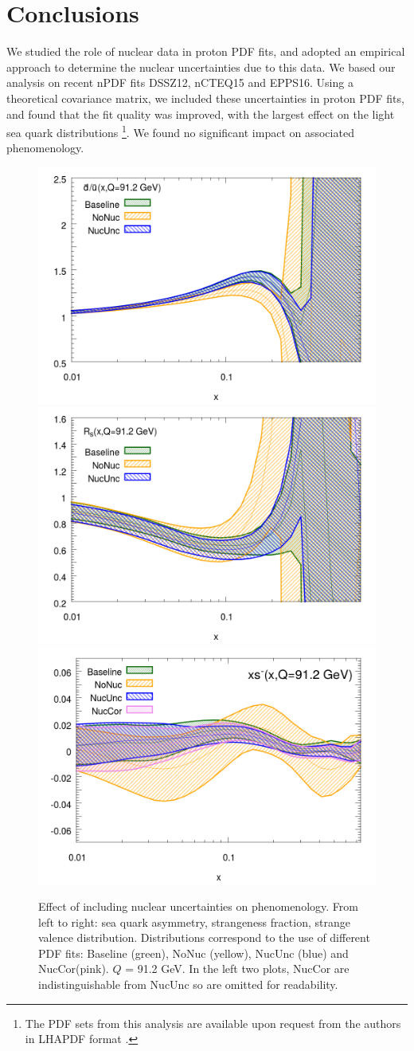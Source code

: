 \section{Conclusions} \label{sec:conc}
%
We studied the role of nuclear data in proton PDF fits, and adopted an empirical approach to determine the nuclear uncertainties due to this data. We based our analysis on recent nPDF fits DSSZ12, nCTEQ15 and EPPS16. Using a theoretical covariance matrix, we included these uncertainties in proton PDF fits, and found that the fit quality was improved, with the largest effect on the light sea quark distributions \footnote{The PDF sets from this analysis are available upon request from the authors in LHAPDF format \cite{Buckley:2014ana}.}. We found no significant impact on associated phenomenology. 
\begin{figure}[h]
  \centering
\includegraphics[width=0.6\linewidth]{nuclear/du_max.png}
\includegraphics[width=0.6\linewidth]{nuclear/Rs_max.png}
\includegraphics[width=0.6\linewidth]{nuclear/sval_max.png}
    \caption{Effect of including nuclear uncertainties on phenomenology. From left to right: sea quark asymmetry, strangeness fraction, strange valence distribution. Distributions correspond to the use of different PDF fits: Baseline (green), NoNuc (yellow), NucUnc (blue) and NucCor(pink). $Q$ = 91.2 GeV. In the left two plots, NucCor are indistinguishable from NucUnc so are omitted for readability.\label{fig:pheno}} 
\end{figure}

